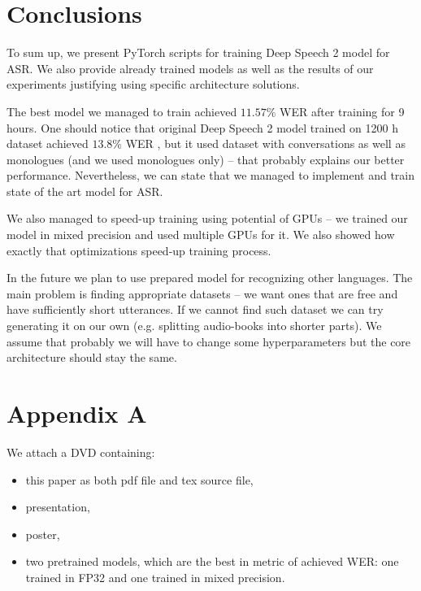 \documentclass[licencjacka,en]{pracamgr}
\begin{document}
	
	\chapter{Conclusions}\label{r:concls}
	
	To sum up, we present PyTorch scripts for training Deep Speech 2 model for ASR. We also provide already trained models as well as the results of our experiments justifying using specific architecture solutions.
	
	The best model we managed to train achieved $11.57$\% WER after training for 9 hours. One should notice that original Deep Speech 2 model trained on 1200 h dataset achieved $13.8$\% WER \cite{DS2}, but it used dataset with conversations as well as monologues (and we used monologues only) -- that probably explains our better performance. Nevertheless, we can state that we managed to implement and train state of the art model for ASR.
	
	We also managed to speed-up training using potential of GPUs -- we trained our model in mixed precision and used multiple GPUs for it. We also showed how exactly that optimizations speed-up training process.
	
	In the future we plan to use prepared model for recognizing other languages. The main problem is finding appropriate datasets -- we want ones that are free and have sufficiently short utterances. If we cannot find such dataset we can try generating it on our own (e.g. splitting audio-books into shorter parts). We assume that probably we will have to change some hyperparameters but the core architecture should stay the same.
	
	\chapter{Appendix A}
	
	We attach a DVD containing: 
	
	\begin{itemize}
		\item this paper as both pdf file and tex source file,
		\item presentation,
		\item poster,
		\item two pretrained models, which are the best in metric of achieved WER: one trained in FP32 and one trained in mixed precision.
	\end{itemize}
	
\end{document}
